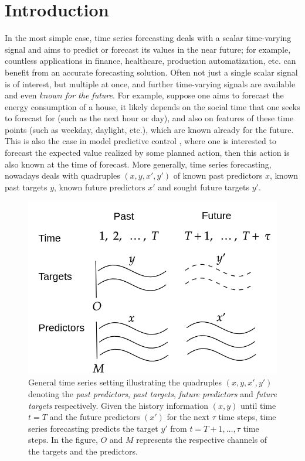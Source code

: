 \section{Introduction}

In the most simple case, time series forecasting deals with a scalar
time-varying signal and aims to predict or forecast its values in the near future; for example, countless applications in finance, healthcare, production automatization, etc. \cite{cao2018brits,sagheer2019time,sezer2020financial} can benefit from an accurate forecasting solution.
Often not just a single scalar signal is of interest, but multiple at once,
and further time-varying signals are available and even \textsl{known for the future}.
For example, suppose one aims to forecast the energy consumption of a house, it likely depends on the social time that one seeks to forecast for (such as the next hour or day), and also on features of these time points (such as weekday, daylight, etc.), which are known already for the future. This is also the case in model predictive control \cite{camacho2013model}, where one is interested
to forecast the expected value realized by some planned action, then this action is also known at the time of forecast.
More generally,
time series forecasting, nowadays deals with quadruples $(x,y,x',y')$
of known past predictors $x$, known past targets $y$, known future predictors $x'$
and sought future targets $y'$. 

\begin{figure}[ht]
\centering

\includegraphics[width=0.4\columnwidth]{figs/ts_ps.png}
\caption{General time series setting illustrating the quadruples $(x,y,x',y')$ denoting the \textsl{past predictors}, \textsl{past targets}, \textsl{future predictors} and \textsl{future targets} respectively. Given the history information $(x, y)$ until time $t = T$ and the future predictors $(x')$ for the next $\tau$ time steps, time series forecasting predicts the target $y'$ from $t = T+1, \dots, \tau$ time steps. In the figure, $O$ and $M$ represents the respective channels of the targets and the predictors.}
\label{fig:ts_ps}
\end{figure}


